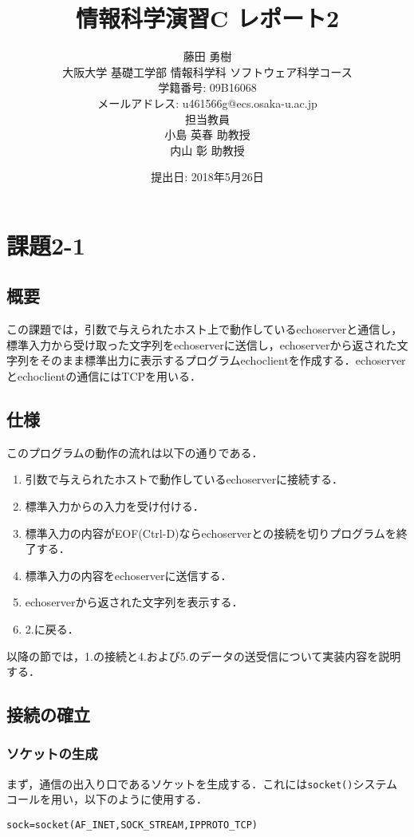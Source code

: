 \documentclass[a4j,10pt,titlepage]{jsarticle}
\title{情報科学演習C レポート2}
\author{藤田 勇樹 \\
大阪大学 基礎工学部 情報科学科 ソフトウェア科学コース\\
学籍番号: 09B16068 \\
メールアドレス: u461566g@ecs.osaka-u.ac.jp \\
担当教員\\
小島 英春 助教授 \\
内山 彰 助教授}
\date{提出日: 2018年5月26日}
\begin{document}
\maketitle
\section{課題2-1}
\subsection{概要}
この課題では，引数で与えられたホスト上で動作しているechoserverと通信し，標準入力から受け取った文字列をechoserverに送信し，echoserverから返された文字列をそのまま標準出力に表示するプログラムechoclientを作成する．echoserverとechoclientの通信にはTCPを用いる．

\subsection{仕様}
このプログラムの動作の流れは以下の通りである．
\begin{enumerate}
  \item 引数で与えられたホストで動作しているechoserverに接続する．
  \item 標準入力からの入力を受け付ける．
  \item 標準入力の内容がEOF(Ctrl-D)ならechoserverとの接続を切りプログラムを終了する．
  \item 標準入力の内容をechoserverに送信する．
  \item echoserverから返された文字列を表示する．
  \item 2.に戻る．
\end{enumerate}

以降の節では，1.の接続と4.および5.のデータの送受信について実装内容を説明する．

\subsection{接続の確立}
\subsubsection{ソケットの生成}
まず，通信の出入り口であるソケットを生成する．これには\verb|socket()|システムコールを用い，以下のように使用する．

\begin{verbatim}
sock=socket(AF_INET,SOCK_STREAM,IPPROTO_TCP)
\end{verbatim}
\end{document}
